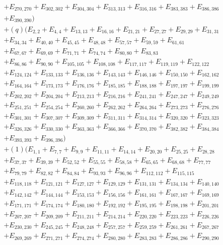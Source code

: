 \documentclass[10pt,a4paper]{amsart}
\numberwithin{equation}{section}
\theoremstyle{definition}
\begin{document}
\begin{align*}
&+E_{270,270}+E_{302,302}+E_{304,304}+E_{313,313}+E_{316,316}+E_{383,383}+E_{386,386}\\
&+E_{390,390})\\
&+(q)(E_{2,2}+E_{4,4}+E_{13,13}+E_{16,16}+E_{21,21}+E_{27,27}+E_{29,29}+E_{31,31}\\
&+E_{34,34}+E_{40,40}+E_{45,45}+E_{48,48}+E_{57,57}+E_{59,59}+E_{61,61}\\
&+E_{67,67}+E_{69,69}+E_{71,71}+E_{74,74}+E_{80,80}+E_{83,83}\\
&+E_{86,86}+E_{90,90}+E_{105,105}+E_{108,108}+E_{117,117}+E_{119,119}+E_{122,122}\\
&+E_{124,124}+E_{133,133}+E_{136,136}+E_{143,143}+E_{146,146}+E_{150,150}+E_{162,162}\\
&+E_{164,164}+E_{173,173}+E_{176,176}+E_{185,185}+E_{188,188}+E_{197,197}+E_{199,199}\\
&+E_{202,202}+E_{204,204}+E_{213,213}+E_{216,216}+E_{241,241}+E_{247,247}+E_{249,249}\\
&+E_{251,251}+E_{254,254}+E_{260,260}+E_{262,262}+E_{264,264}+E_{273,273}+E_{276,276}\\
&+E_{301,301}+E_{307,307}+E_{309,309}+E_{311,311}+E_{314,314}+E_{320,320}+E_{323,323}\\
&+E_{326,326}+E_{330,330}+E_{363,363}+E_{366,366}+E_{370,370}+E_{382,382}+E_{384,384}\\
&+E_{393,393}+E_{396,396})\\
&+(1)(E_{1,1}+E_{7,7}+E_{9,9}+E_{11,11}+E_{14,14}+E_{20,20}+E_{25,25}+E_{28,28}\\
&+E_{37,37}+E_{39,39}+E_{52,52}+E_{55,55}+E_{58,58}+E_{65,65}+E_{68,68}+E_{77,77}\\
&+E_{79,79}+E_{82,82}+E_{84,84}+E_{93,93}+E_{96,96}+E_{112,112}+E_{115,115}\\
&+E_{118,118}+E_{121,121}+E_{127,127}+E_{129,129}+E_{131,131}+E_{134,134}+E_{140,140}\\
&+E_{142,142}+E_{144,144}+E_{153,153}+E_{156,156}+E_{161,161}+E_{167,167}+E_{169,169}\\
&+E_{171,171}+E_{174,174}+E_{180,180}+E_{192,192}+E_{195,195}+E_{198,198}+E_{201,201}\\
&+E_{207,207}+E_{209,209}+E_{211,211}+E_{214,214}+E_{220,220}+E_{223,223}+E_{226,226}\\
&+E_{230,230}+E_{245,245}+E_{248,248}+E_{257,257}+E_{259,259}+E_{261,261}+E_{267,267}\\
&+E_{269,269}+E_{271,271}+E_{274,274}+E_{280,280}+E_{283,283}+E_{286,286}+E_{290,290}\\

\end{align*}
\end{document}
